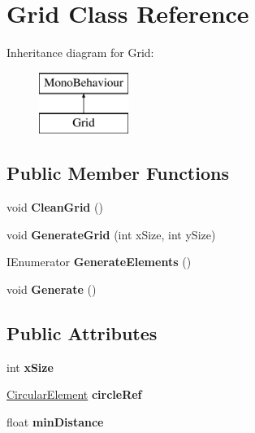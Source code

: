 \hypertarget{class_grid}{}\section{Grid Class Reference}
\label{class_grid}
Inheritance diagram for Grid\+:\begin{figure}[H]
\begin{center}
\leavevmode
\includegraphics[height=2.000000cm]{class_grid}
\end{center}
\end{figure}
\subsection*{Public Member Functions}
\begin{DoxyCompactItemize}
\item 
\mbox{\label{class_grid_ac21bfc827b59e29af93cf38cfeef71b7}} 
void {\bfseries Clean\+Grid} ()
\item 
\mbox{\label{class_grid_a8ae55ecdb63003b0e0b225bf057c7703}} 
void {\bfseries Generate\+Grid} (int x\+Size, int y\+Size)
\item 
\mbox{\label{class_grid_aa5bae6cb91c6d9fd4e01b28c27281bce}} 
I\+Enumerator {\bfseries Generate\+Elements} ()
\item 
\mbox{\label{class_grid_ad94667c037068a4fcb29523d04079ac8}} 
void {\bfseries Generate} ()
\end{DoxyCompactItemize}
\subsection*{Public Attributes}
\begin{DoxyCompactItemize}
\item 
\mbox{\label{class_grid_a58b61c766bade49f79f34e0077ea05b6}} 
int {\bfseries x\+Size}
\item 
\mbox{\label{class_grid_a9937b5b55c3dbe77aa73edcac15f04bf}} 
\hyperlink{class_circular_element}{Circular\+Element} {\bfseries circle\+Ref}
\item 
\mbox{\label{class_grid_ad1c6c49c18d89e95946edbf84eddd73c}} 
float {\bfseries min\+Distance}
\end{DoxyCompactItemize}
